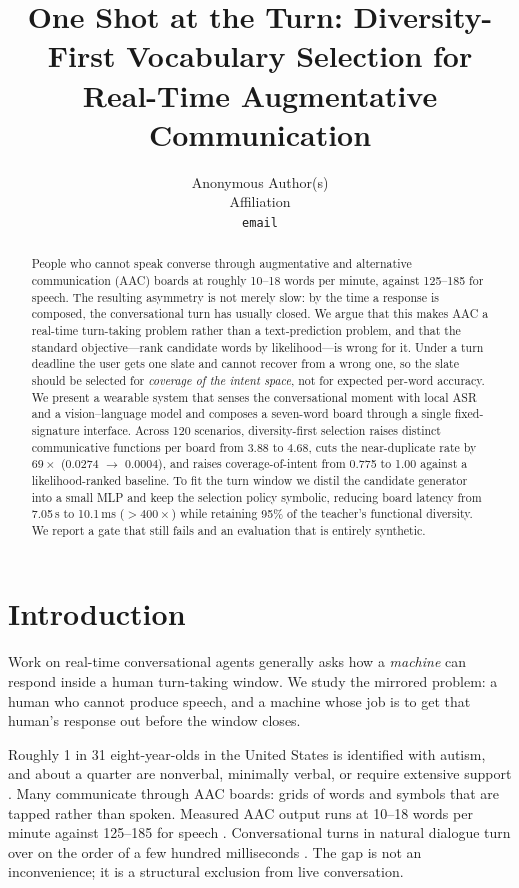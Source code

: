 \documentclass{article}
\title{One Shot at the Turn: Diversity-First Vocabulary Selection
for Real-Time Augmentative Communication}
\author{Anonymous Author(s)\\Affiliation\\\texttt{email}}
\begin{document}
\maketitle

\begin{abstract}
People who cannot speak converse through augmentative and alternative
communication (AAC) boards at roughly 10--18 words per minute, against
125--185 for speech. The resulting asymmetry is not merely slow: by the time a
response is composed, the conversational turn has usually closed. We argue that
this makes AAC a real-time turn-taking problem rather than a text-prediction
problem, and that the standard objective---rank candidate words by
likelihood---is wrong for it. Under a turn deadline the user gets one slate and
cannot recover from a wrong one, so the slate should be selected for
\emph{coverage of the intent space}, not for expected per-word accuracy. We
present a wearable system that senses the conversational moment with local ASR
and a vision--language model and composes a seven-word board through a single
fixed-signature interface. Across 120 scenarios, diversity-first selection
raises distinct communicative functions per board from 3.88 to 4.68, cuts the
near-duplicate rate by $69\times$ (0.0274 $\rightarrow$ 0.0004), and raises
coverage-of-intent from 0.775 to 1.00 against a likelihood-ranked baseline. To
fit the turn window we distil the candidate generator into a small MLP and keep
the selection policy symbolic, reducing board latency from 7.05\,s to 10.1\,ms
(${>}400\times$) while retaining 95\% of the teacher's functional diversity. We
report a gate that still fails and an evaluation that is entirely synthetic.
\end{abstract}

\section{Introduction}

Work on real-time conversational agents generally asks how a \emph{machine} can
respond inside a human turn-taking window. We study the mirrored problem: a
human who cannot produce speech, and a machine whose job is to get that human's
response out before the window closes.

Roughly 1 in 31 eight-year-olds in the United States is identified with autism,
and about a quarter are nonverbal, minimally verbal, or require extensive
support \citep{cdc2025}. Many communicate through AAC boards: grids of words and
symbols that are tapped rather than spoken. Measured AAC output runs at
10--18 words per minute against 125--185 for speech
\citep{beukelman2013}. Conversational turns in natural dialogue turn over on the
order of a few hundred milliseconds \citep{sacks1974}. The gap is not an
inconvenience; it is a structural exclusion from live conversation.
\end{document}
